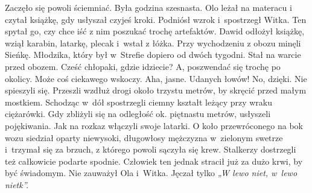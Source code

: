 \documentclass[../MAIN.tex]{subfiles}
\begin{document}
Zaczęło się powoli ściemniać. Była godzina szesnasta. Olo leżał na materacu i
czytał książkę, gdy usłyszał czyjeś kroki. Podniósł wzrok i~spostrzegł Witka.
Ten spytał go, czy chce iść z nim poszukać trochę artefaktów. Dawid odłożył
książkę, wziął karabin, latarkę, plecak i~wstał z łóżka.
%
%
Przy wychodzeniu z obozu minęli Sieńkę. Młodzika, który był w~Strefie dopiero od dwóch tygodni. Stał na warcie przed obozem.
\sd
\xx Cześć chłopaki, gdzie idziecie?
\xx A, poszwendać się trochę po okolicy. Może coś ciekawego wskoczy.
\xx Aha, jasne. Udanych łowów!
\xx No, dzięki.
\qd
Nie spieszyli się. Przeszli wzdłuż drogi oko\-ło trzystu metrów, by skręcić przed małym mostkiem. Schodząc w~dół spostrzegli ciemny kształt leżący przy wraku ciężarówki. Gdy zbliżyli się na odległość ok. piętnastu metrów, usłyszeli pojękiwania. Jak na rozkaz włączyli swoje latarki. O koło przewróconego na bok wozu siedział oparty niewysoki, długowłosy mężczyzna w~zielonym swetrze i~trzymał się za brzuch, z którego powoli sączyła się krew. Stalkerzy dostrzegli też całkowicie podarte spodnie. Człowiek ten jednak stracił już za dużo krwi, by być świadomym. Nie zauważył Ola i~Witka. Jęczał tylko \textit{„W lewo niet, w~lewo niet\3k”.}
\end{document}
